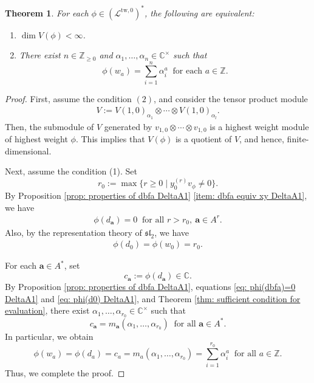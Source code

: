 \documentclass[12pt,a4paper]{amsart}
\newtheorem{thm}{Theorem}[subsection]
\theoremstyle{definition}
\numberwithin{equation}{subsection}
\begin{document}
\begin{thm}\label{thm: classification DeltaA1}
  For each $\phi \in (\mathcal{L}^{\mathrm{tw},0})^*$, the following are equivalent:
  \begin{enumerate}
    \item $\dim V(\phi) < \infty$.
    \item There exist $n \in \mathbb{Z}_{\geq 0}$ and $\alpha_1,\dots,\alpha_n \in \mathbb{C}^\times$ such that
    \[
      \phi(w_a) = \sum_{i=1}^n \alpha_i^a \ \text{ for each } a \in \mathbb{Z}.
    \]
  \end{enumerate}
\end{thm}
\begin{proof}
  First, assume the condition $(2)$, and consider the tensor product module
  \begin{align}\label{eq: V(1)a1 ot V(1)ar}
    V := V(1,0)_{\alpha_1} \otimes \cdots \otimes V(1,0)_{\alpha_l}.
  \end{align}
  Then, the submodule of $V$ generated by $v_{1,0} \otimes \cdots \otimes v_{1,0}$ is a highest weight module of highest weight $\phi$.
  This implies that $V(\phi)$ is a quotient of $V$, and hence, finite-dimensional.

  Next, assume the condition (1).
  Set
  \[
    r_0 := \max\{ r \geq 0 \mid y_0^{(r)} v_\phi \neq 0 \}.
  \]
  By Proposition \ref{prop: properties of dbfa DeltaA1} \eqref{item: dbfa equiv xy DeltaA1}, we have
  \begin{align}\label{eq: phi(dbfa)=0 DeltaA1}
    \phi(d_\mathbf{a}) = 0 \ \text{ for all } r > r_0,\ \mathbf{a} \in A^r.
  \end{align}
  Also, by the representation theory of $\mathfrak{sl}_2$, we have
  \begin{align}\label{eq: phi(d0) DeltaA1}
    \phi(d_0) = \phi(w_0) = r_0.
  \end{align}

  For each $\mathbf{a} \in A^*$, set
  \[
    c_\mathbf{a} := \phi(d_\mathbf{a}) \in \mathbb{C}.
  \]
  By Proposition \ref{prop: properties of dbfa DeltaA1}, equations \eqref{eq: phi(dbfa)=0 DeltaA1} and \eqref{eq: phi(d0) DeltaA1}, and Theorem \ref{thm: sufficient condition for evaluation}, there exist $\alpha_1,\dots,\alpha_{r_0} \in \mathbb{C}^\times$ such that
  \[
    c_\mathbf{a} = m_\mathbf{a}(\alpha_1,\dots,\alpha_{r_0}) \ \text{ for all } \mathbf{a} \in A^*.
  \]
  In particular, we obtain
  \[
    \phi(w_a) = \phi(d_a) = c_a = m_a(\alpha_1,\dots,\alpha_{r_0}) = \sum_{i=1}^{r_0} \alpha_i^a \ \text{ for all } a \in \mathbb{Z}.
  \]
  Thus, we complete the proof.
\end{proof}
\end{document}
